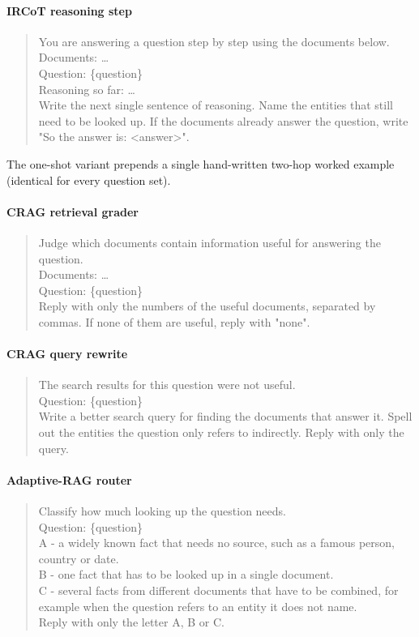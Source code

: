 \paragraph{IRCoT reasoning step}
\begin{quote}\small\ttfamily\raggedright
You are answering a question step by step using the documents below.\\[2pt]
Documents: \ldots\\
Question: \{question\}\\
Reasoning so far: \ldots\\[2pt]
Write the next single sentence of reasoning. Name the entities that still
need to be looked up. If the documents already answer the question, write
"So the answer is: <answer>".
\end{quote}
The one-shot variant prepends a single hand-written two-hop worked example
(identical for every question set).

\paragraph{CRAG retrieval grader}
\begin{quote}\small\ttfamily\raggedright
Judge which documents contain information useful for answering the
question.\\[2pt]
Documents: \ldots\\
Question: \{question\}\\[2pt]
Reply with only the numbers of the useful documents, separated by commas.
If none of them are useful, reply with "none".
\end{quote}

\paragraph{CRAG query rewrite}
\begin{quote}\small\ttfamily\raggedright
The search results for this question were not useful.\\[2pt]
Question: \{question\}\\[2pt]
Write a better search query for finding the documents that answer it.
Spell out the entities the question only refers to indirectly. Reply with
only the query.
\end{quote}

\paragraph{Adaptive-RAG router}
\begin{quote}\small\ttfamily\raggedright
Classify how much looking up the question needs.\\[2pt]
Question: \{question\}\\[2pt]
A - a widely known fact that needs no source, such as a famous person,
country or date.\\
B - one fact that has to be looked up in a single document.\\
C - several facts from different documents that have to be combined, for
example when the question refers to an entity it does not name.\\[2pt]
Reply with only the letter A, B or C.
\end{quote}

